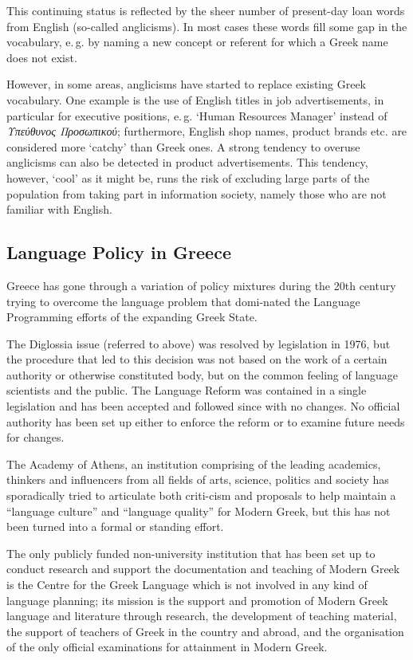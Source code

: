 \documentclass[]{../../metanetpaper}
\begin{document}
\begin{multicols}{2}
This continuing status is reflected by the sheer number of present-day loan words from English (so-called anglicisms). In most cases these words fill some gap in the vocabulary, e.\,g. by naming a new concept or referent for which a Greek name does not exist.

However, in some areas, anglicisms have started to replace existing Greek vocabulary. One example is the use of English titles in job advertisements, in particular for executive positions, e.\,g. ‘Human Resources Manager’ instead of \textit{Υπεύθυνος Προσωπικού}; furthermore, English shop names, product brands etc. are considered more ‘catchy’ than Greek ones. A strong tendency to overuse anglicisms can also be detected in product advertisements. This tendency, however, ‘cool’ as it might be, runs the risk of excluding large parts of the population from taking part in information society, namely those who are not familiar with English.

\subsection{Language Policy in Greece}

Greece has gone through a variation of policy mixtures during the 20th century trying to overcome the language problem that domi-nated the Language Programming efforts of the expanding Greek State.

The Diglossia issue (referred to above) was resolved by legislation in 1976, but the procedure that led to this decision was not based on the work of a certain authority or otherwise constituted body, but on the common feeling of language scientists and the public. The Language Reform was contained in a single legislation and has been accepted and followed since with no changes. No official authority has been set up either to enforce the reform or to examine future needs for changes.

The Academy of Athens, an institution comprising of the leading academics, thinkers and influencers from all fields of arts, science, politics and society has sporadically tried to articulate both criti-cism and proposals to help maintain a “language culture” and “language quality” for Modern Greek, but this has not been turned into a formal or standing effort.

The only publicly funded non-university institution that has been set up to conduct research and support the documentation and teaching of Modern Greek is the Centre for the Greek Language which is not involved in any kind of language planning; its mission is the support and promotion of Modern Greek language and literature through research, the development of teaching material, the support of teachers of Greek in the country and abroad, and the organisation of the only official examinations for attainment in Modern Greek.


\end{multicols}
\end{document}
